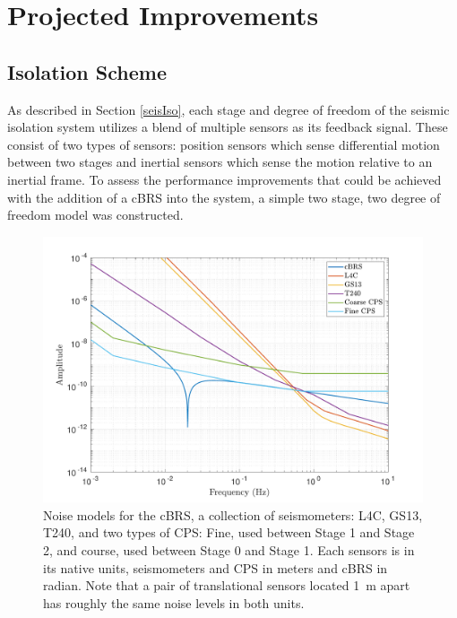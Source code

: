 \documentclass [12pt, proquest]{uwthesis}[2019]
\begin{document}
\section{Projected Improvements}
\subsection{Isolation Scheme} \label{IsoScheme}

As described in Section \ref{seisIso}, each stage and degree of freedom of the seismic isolation system utilizes a blend of multiple sensors as its feedback signal. These consist of two types of sensors: position sensors which sense differential motion between two stages and inertial sensors which sense the motion relative to an inertial frame. To assess the performance improvements that could be achieved with the addition of a cBRS into the system, a simple two stage, two degree of freedom model was constructed. 

\begin{figure}[!h]
\begin{center}
\includegraphics[width=\textwidth]{cBRS_Model_Noise.pdf}
\caption[Noise models for the cBRS, a collection of seismometers, and two types of CPS]{Noise models for the cBRS, a collection of seismometers: L4C, GS13, T240, and two types of CPS: Fine, used between Stage 1 and Stage 2, and course, used between Stage 0 and Stage 1. Each sensors is in its native units, seismometers and CPS in meters and cBRS in radian. Note that a pair of translational sensors located 1~m apart has roughly the same noise levels in both units.}
\label{sensNoise}
\end{center}
\end{figure}
\end{document}
